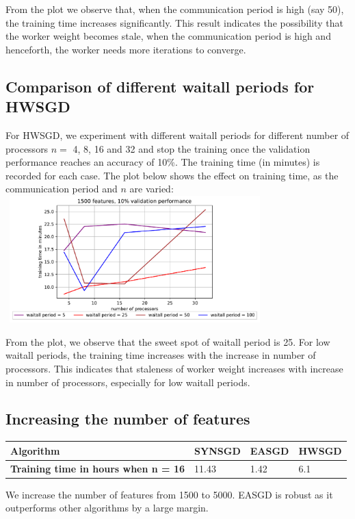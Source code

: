 \documentclass[12pt]{article}
\begin{document}
From the plot we observe that, when the communication period is high (say 50), the training time increases significantly. This result indicates the possibility that the worker weight becomes stale, when the communication period is high and henceforth, the worker needs more iterations to converge.

\subsection{Comparison of different waitall periods for HWSGD}
For HWSGD, we experiment with different waitall periods for different number of processors $n=$ 4, 8, 16 and 32 and stop the training once the validation performance reaches an accuracy of 10\%. The  training  time (in  minutes)  is  recorded  for  each  case. The plot below shows the effect on training time, as the communication period and $n$ are varied:\\

{\centering
\includegraphics[width=10cm, height=4.9cm]{images/1500f_10v_hw.pdf}\\
}

From the plot, we observe that the sweet spot of waitall period is 25. For low waitall periods, the training time increases with the increase in number of processors. This indicates that staleness of worker weight increases with increase in number of processors, especially for low waitall periods.


\subsection{Increasing the number of features}
\begin{table}[ht]
\centering
 \begin{tabular}{llll} 
 \toprule
\textbf{Algorithm} & SYNSGD & EASGD & HWSGD \\ \midrule
\textbf{Training time in hours when n = 16} & 11.43 & 1.42 & 6.1 \\
\bottomrule
\end{tabular}
\end{table}
We increase the number of features from 1500 to 5000. EASGD is robust as it outperforms other algorithms by a large margin. 
\end{document}
